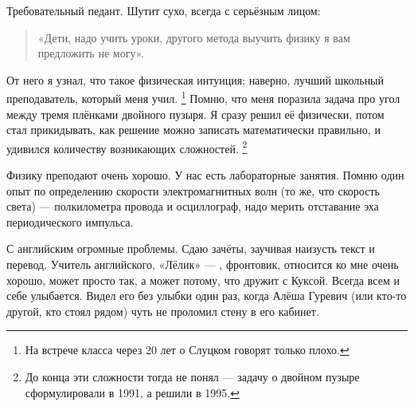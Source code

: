 \documentclass{book}
\begin{document}
Требовательный педант.
Шутит сухо, всегда с серьёзным лицом:
\begin{verse}
«Дети, надо учить уроки, другого метода выучить физику я вам предложить не могу».
\end{verse}
От него я узнал, что такое физическая интуиция;
наверно, лучший школьный преподаватель, который меня учил.%
\footnote{На встрече класса через 20 лет о Слуцком говорят только плохо.} 
Помню, что меня поразила задача про угол между тремя плёнками двойного пузыря.
Я сразу решил её физически, потом стал прикидывать, как решение можно записать математически правильно,
и удивился количеству возникающих сложностей.%
\footnote{До конца эти сложности тогда не понял --- задачу о двойном пузыре сформулировали в 1991, а решили в 1995.}

Физику преподают очень хорошо.
У нас есть лабораторные занятия.
Помню один опыт по определению скорости электромагнитных волн (то же, что скорость света)
---
полкилометра провода и осциллограф,
надо мерить отставание эха периодического импульса.

С английским огромные проблемы.
Сдаю зачёты, заучивая наизусть текст и перевод.
Учитель английского, «Лёлик» --- , фронтовик,
относится ко мне очень хорошо, 
может просто так, а может потому, что дружит с Куксой.
Всегда всем и себе улыбается.
Видел его без улыбки один раз,
когда Алёша Гуревич (или кто-то другой, кто стоял рядом) 
чуть не проломил стену в его кабинет.
\end{document}
